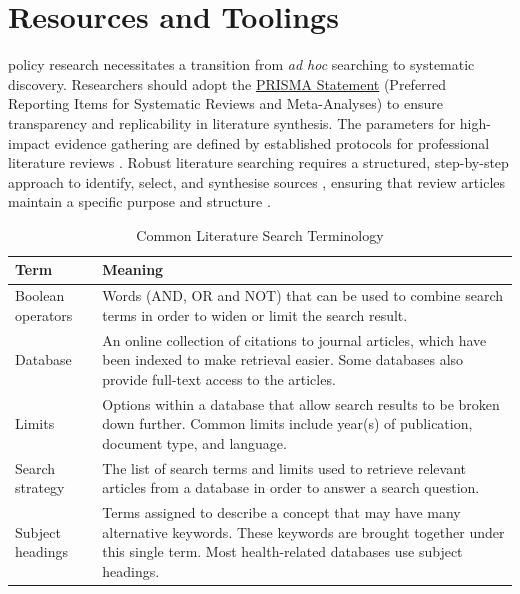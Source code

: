 \documentclass[12pt, a4paper]{article}
\begin{document}
\section{Resources and Toolings}

 policy research necessitates a transition from \textit{ad hoc} searching to systematic discovery. Researchers should adopt the \href{https://www.prisma-statement.org/}{PRISMA Statement} (Preferred Reporting Items for Systematic Reviews and Meta-Analyses) to ensure transparency and replicability in literature synthesis. The parameters for high-impact evidence gathering are defined by established protocols for professional literature reviews \citep{watson_how_2020}. Robust literature searching requires a structured, step-by-step approach to identify, select, and synthesise sources \citep{chigbu_science_2023}, ensuring that review articles maintain a specific purpose and structure \citep{palmatier_review_2018}.

\begin{table}[ht]
	\centering
	\caption{Common Literature Search Terminology \citep{watson_how_2020,de_brun_searching_2014}}
	\label{tab:SearchTerms}
	\begin{tabularx}{\textwidth}{@{} l X @{}}
		\toprule
		Term              & Meaning                                                                                                                                                                                       \\
		\midrule
		Boolean operators & Words (AND, OR and NOT) that can be used to combine search terms in order to widen or limit the search result.                                                                                \\
		\addlinespace
		Database          & An online collection of citations to journal articles, which have been indexed to make retrieval easier. Some databases also provide full-text access to the articles.                        \\
		\addlinespace
		Limits            & Options within a database that allow search results to be broken down further. Common limits include year(s) of publication, document type, and language.                                     \\
		\addlinespace
		Search strategy   & The list of search terms and limits used to retrieve relevant articles from a database in order to answer a search question.                                                                  \\
		\addlinespace
		Subject headings  & Terms assigned to describe a concept that may have many alternative keywords. These keywords are brought together under this single term. Most health-related databases use subject headings. \\
		\bottomrule
	\end{tabularx}
\end{table}
\end{document}
